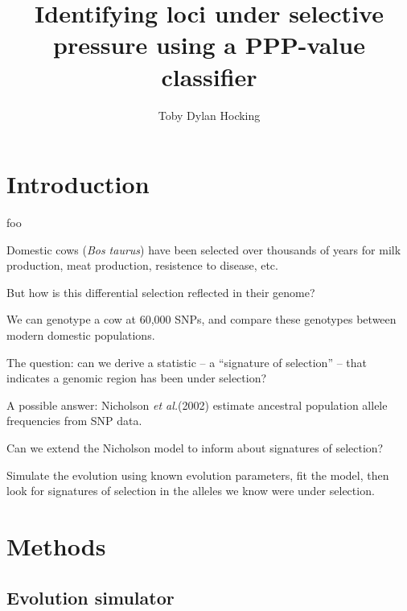 \documentclass[a4paper,12pt]{article}
\title{Identifying loci under selective pressure using a PPP-value classifier}
\author{Toby Dylan Hocking}
\begin{document}
\maketitle

\newcommand{\fig}[3][1]{
  \begin{figure}[htp]
    \begin{center}
    \texttt{[image: \#2]}
    \end{center}
    \caption{#3\label{#2}}
  \end{figure}
}
\newcommand{\brat}[2]{
  \left[
    \begin{array}{#1}
      #2
    \end{array}
    \right]
}
\newcommand{\neff}{\text{popsize}}
\newcommand{\aij}{\alpha_{ij}(t)}
\newcommand{\aijs}{\alpha_{ij}^*(t)}
\newcommand{\wij}[1]{w_{ij}^{\text{#1}}}
\newcommand{\etal}{\emph{et al.}}
\newcommand{\RR}{\mathbb R}
\newcommand{\Bin}{\operatorname{Binomial}}

\section{Introduction}

foo

 Domestic cows (\emph{Bos taurus}) have been selected over
  thousands of years for milk production, meat production, resistence
  to disease, etc.

 But how is this differential selection reflected in their
  genome?

 We can genotype a cow at 60,000 SNPs, and compare these
  genotypes between modern domestic populations.

 The question: can we derive a statistic -- a ``signature of
  selection'' -- that indicates a genomic region has been under
  selection?

 A possible answer: Nicholson \etal (2002) estimate ancestral
  population allele frequencies from SNP data.

 Can we extend the Nicholson model to inform about signatures of
  selection?

 Simulate the evolution using known evolution parameters, fit the
  model, then look for signatures of selection in the alleles we know
  were under selection.

\section{Methods}

\subsection{Evolution simulator}
\end{document}
